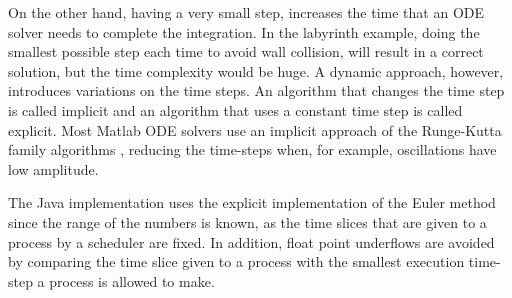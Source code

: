 On the other hand, having a very small step, increases the time that an ODE solver needs to complete the integration. In the labyrinth example, doing the smallest possible step each time to avoid wall collision, will result in a correct solution, but the time complexity would be huge. A dynamic approach, however, introduces variations on the time steps. An algorithm that changes the time step is called implicit and an algorithm that uses a constant time step is called explicit. Most Matlab ODE solvers use an implicit approach of the Runge-Kutta family algorithms \cite{MATLAB_2010}, reducing the time-steps when, for example, oscillations have low amplitude. 

The Java implementation uses the explicit implementation of the Euler method since the range of the numbers is known, as the time slices that are given to a process by a scheduler are fixed. In addition, float point underflows are avoided by comparing the time slice given to a process with the smallest execution time-step a process is allowed to make.
